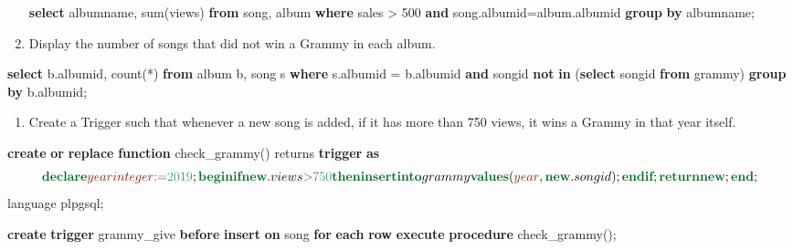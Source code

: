 \documentclass[
]{article}
\newenvironment{Shaded}{}{}
\newcommand{\ControlFlowTok}[1]{\textcolor[rgb]{0.00,0.44,0.13}{\textbf{#1}}}
\newcommand{\DataTypeTok}[1]{\textcolor[rgb]{0.56,0.13,0.00}{#1}}
\newcommand{\DecValTok}[1]{\textcolor[rgb]{0.25,0.63,0.44}{#1}}
\newcommand{\FunctionTok}[1]{\textcolor[rgb]{0.02,0.16,0.49}{#1}}
\newcommand{\KeywordTok}[1]{\textcolor[rgb]{0.00,0.44,0.13}{\textbf{#1}}}
\newcommand{\NormalTok}[1]{#1}
\newcommand{\OperatorTok}[1]{\textcolor[rgb]{0.40,0.40,0.40}{#1}}
\providecommand{\tightlist}{%
  \setlength{\itemsep}{0pt}\setlength{\parskip}{0pt}}
\begin{document}
\begin{enumerate}
\begin{Shaded}
\begin{Highlighting}[]
\KeywordTok{select}\NormalTok{ albumname, }\FunctionTok{sum}\NormalTok{(views) }\KeywordTok{from}\NormalTok{ song, album }\KeywordTok{where}\NormalTok{ sales }\OperatorTok{>} \DecValTok{500} \KeywordTok{and}\NormalTok{ song.albumid}\OperatorTok{=}\NormalTok{album.albumid }\KeywordTok{group} \KeywordTok{by}\NormalTok{ albumname;}
\end{Highlighting}
\end{Shaded}
\item
  Display the number of songs that did not win a Grammy in each album.
\end{enumerate}

\begin{Shaded}
\begin{Highlighting}[]
\KeywordTok{select}\NormalTok{ b.albumid, }\FunctionTok{count}\NormalTok{(}\OperatorTok{*}\NormalTok{) }\KeywordTok{from}\NormalTok{ album b, song s }\KeywordTok{where}\NormalTok{ s.albumid }\OperatorTok{=}\NormalTok{ b.albumid }\KeywordTok{and}\NormalTok{ songid }\KeywordTok{not} \KeywordTok{in}\NormalTok{ (}\KeywordTok{select}\NormalTok{ songid }\KeywordTok{from}\NormalTok{ grammy) }\KeywordTok{group} \KeywordTok{by}\NormalTok{ b.albumid;}
\end{Highlighting}
\end{Shaded}

\begin{enumerate}
\def\labelenumi{\arabic{enumi}.}
\setcounter{enumi}{5}
\tightlist
\item
  Create a Trigger such that whenever a new song is added, if it has
  more than 750 views, it wins a Grammy in that year itself.
\end{enumerate}

\begin{Shaded}
\begin{Highlighting}[]
\KeywordTok{create} \KeywordTok{or} \KeywordTok{replace} \KeywordTok{function}\NormalTok{ check\_grammy()}
\NormalTok{returns }\KeywordTok{trigger} \KeywordTok{as}\NormalTok{ $$}
\KeywordTok{declare}
\DataTypeTok{year} \DataTypeTok{integer} \OperatorTok{:=} \DecValTok{2019}\NormalTok{;}
\ControlFlowTok{begin}
\ControlFlowTok{if} \KeywordTok{new}\NormalTok{.views }\OperatorTok{>} \DecValTok{750} \ControlFlowTok{then}
\KeywordTok{insert} \KeywordTok{into}\NormalTok{ grammy }\KeywordTok{values}\NormalTok{(}\DataTypeTok{year}\NormalTok{, }\KeywordTok{new}\NormalTok{.songid);}
\ControlFlowTok{end} \ControlFlowTok{if}\NormalTok{;}
\KeywordTok{return} \KeywordTok{new}\NormalTok{;}
\ControlFlowTok{end}\NormalTok{;}
\NormalTok{$$ language plpgsql;}

\KeywordTok{create} \KeywordTok{trigger}\NormalTok{ grammy\_give }\KeywordTok{before} \KeywordTok{insert} \KeywordTok{on}\NormalTok{ song }\ControlFlowTok{for} \KeywordTok{each} \KeywordTok{row} \KeywordTok{execute} \KeywordTok{procedure}\NormalTok{ check\_grammy();}
\end{Highlighting}
\end{Shaded}
\end{document}
